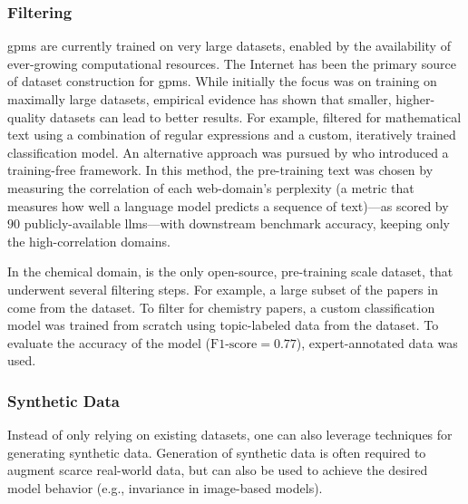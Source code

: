 \subsubsection{Filtering}

\glspl{gpm} are currently trained on very large datasets, enabled by the availability of ever-growing computational resources.\autocite{krizhevsky2012imagenet,kaplan2020scaling, hooker2020hardware, dotan2019value0laden} 
The Internet has been the primary source of dataset construction for \glspl{gpm}. 
While initially the focus was on training on maximally large datasets, empirical evidence has shown that smaller, higher-quality datasets can lead to better results.\autocite{gunasekar2023textbooks, marion2023less} For example, \textcite{shao2024deepseekmath0} filtered  for mathematical text using a combination of regular expressions and a custom, iteratively trained classification model\autocite{bojanowski2017enriching}. 
An alternative approach was pursued by \textcite{thrush2024improving} who introduced a training-free framework. In this method, the pre-training text was chosen by measuring the correlation of each web-domain's perplexity (a metric that measures how well a language model predicts a sequence of text)---as scored by $90$ publicly-available \glspl{llm}---with downstream benchmark accuracy, keeping only the high-correlation domains. 

In the chemical domain, \autocite{mirza2025chempile0} is the only open-source, pre-training scale dataset, that underwent several filtering steps. For example, a large subset of the papers in  come from the  dataset. To filter for chemistry papers, a custom classification model was trained from scratch using topic-labeled data from the \autocite{li2023camel} dataset. To evaluate the accuracy of the model ($\text{F1-score}=0.77$), expert-annotated data was used.


\subsubsection{Synthetic Data}
\label{sec:syn-data}

Instead of only relying on existing datasets, one can also leverage techniques for generating synthetic data. 
Generation of synthetic data is often required to augment scarce real-world data, but can also be used to achieve the desired model behavior (e.g., invariance in image-based models).

